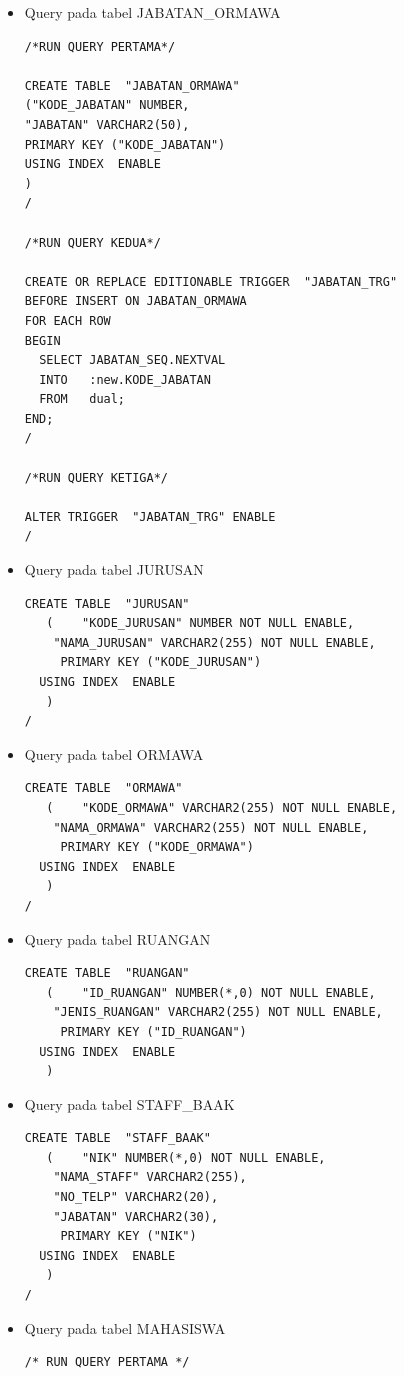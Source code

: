 \begin{itemize}
    \item Query pada tabel JABATAN\_ORMAWA
            \begin{lstlisting}
/*RUN QUERY PERTAMA*/

CREATE TABLE  "JABATAN_ORMAWA" 
("KODE_JABATAN" NUMBER,
"JABATAN" VARCHAR2(50), 
PRIMARY KEY ("KODE_JABATAN")
USING INDEX  ENABLE
)
/

/*RUN QUERY KEDUA*/

CREATE OR REPLACE EDITIONABLE TRIGGER  "JABATAN_TRG" 
BEFORE INSERT ON JABATAN_ORMAWA 
FOR EACH ROW
BEGIN
  SELECT JABATAN_SEQ.NEXTVAL
  INTO   :new.KODE_JABATAN
  FROM   dual;
END;
/

/*RUN QUERY KETIGA*/

ALTER TRIGGER  "JABATAN_TRG" ENABLE
/
            \end{lstlisting}
    \item Query pada tabel JURUSAN
            \begin{lstlisting}
CREATE TABLE  "JURUSAN" 
   (	"KODE_JURUSAN" NUMBER NOT NULL ENABLE, 
	"NAMA_JURUSAN" VARCHAR2(255) NOT NULL ENABLE, 
	 PRIMARY KEY ("KODE_JURUSAN")
  USING INDEX  ENABLE
   )
/
            \end{lstlisting}
    \item Query pada tabel ORMAWA
            \begin{lstlisting}
CREATE TABLE  "ORMAWA" 
   (	"KODE_ORMAWA" VARCHAR2(255) NOT NULL ENABLE, 
	"NAMA_ORMAWA" VARCHAR2(255) NOT NULL ENABLE, 
	 PRIMARY KEY ("KODE_ORMAWA")
  USING INDEX  ENABLE
   )
/
            \end{lstlisting}
        
        \item Query pada tabel RUANGAN
            \begin{lstlisting}
CREATE TABLE  "RUANGAN" 
   (	"ID_RUANGAN" NUMBER(*,0) NOT NULL ENABLE, 
	"JENIS_RUANGAN" VARCHAR2(255) NOT NULL ENABLE, 
	 PRIMARY KEY ("ID_RUANGAN")
  USING INDEX  ENABLE
   )            
            \end{lstlisting}
\item Query pada tabel STAFF\_BAAK
            \begin{lstlisting}
CREATE TABLE  "STAFF_BAAK" 
   (	"NIK" NUMBER(*,0) NOT NULL ENABLE, 
	"NAMA_STAFF" VARCHAR2(255), 
	"NO_TELP" VARCHAR2(20), 
	"JABATAN" VARCHAR2(30), 
	 PRIMARY KEY ("NIK")
  USING INDEX  ENABLE
   )
/
            \end{lstlisting}
\item Query pada tabel MAHASISWA
            \begin{lstlisting}
/* RUN QUERY PERTAMA */


\end{lstlisting}
\end{itemize}
